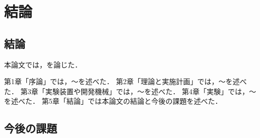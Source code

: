 ﻿

\chapter{結論}\label{chapter:結論}

\section{結論}

本論文では，を論じた．

第1章「序論」では，～を述べた．
第2章「理論と実施計画」では，～を述べた．
第3章「実験装置や開発機械」では，～を述べた．
第4章「実験」では，～を述べた．
第5章「結論」では本論文の結論と今後の課題を述べた．

\section{今後の課題}
